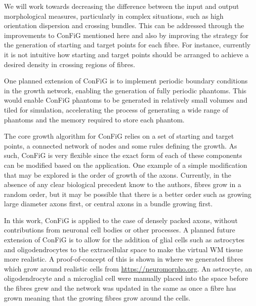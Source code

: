 
We will work towards decreasing the difference between the input and output morphological measures, particularly in complex situations, such as high orientation dispersion and crossing bundles. This can be addressed through the improvements to \ac{ConFiG} mentioned here and also by improving the strategy for the generation of starting and target points for each fibre. For instance, currently it is not intuitive how starting and target points should be arranged to achieve a desired density in crossing regions of fibres.

One planned extension of \ac{ConFiG} is to implement periodic boundary conditions in the growth network, enabling the generation of fully periodic phantoms. This would enable \ac{ConFiG} phantoms to be generated in relatively small volumes and tiled for simulation, accelerating the process of generating a wide range of phantoms and the memory required to store each phantom.

The core growth algorithm for \ac{ConFiG} relies on a set of starting and target points, a connected network of nodes and some rules defining the growth. As such, \ac{ConFiG} is very flexible since the exact form of each of these components can be modified based on the application. One example of a simple modification that may be explored is the order of growth of the axons. Currently, in the absence of any clear biological precedent know to the authors, fibres grow in a random order, but it may be possible that there is a better order such as growing large diameter axons first, or central axons in a bundle growing first.

In this work, \ac{ConFiG} is applied to the case of densely packed axons, without contributions from neuronal cell bodies or other processes. A planned future extension of \ac{ConFiG} is to allow for the addition of glial cells such as astrocytes and oligodendrocytes \cite{Palombo2019} to the extracellular space to make the virtual \ac{WM} tissue more realistic. A proof-of-concept of this is shown in  where we generated fibres which grow around realistic cells from \url{https://neuromorpho.org}. An astrocyte, an oligodendrocyte and a microglial cell were manually placed into the space before the fibres grew and the network was updated in the same as once a fibre has grown meaning that the growing fibres grow around the cells. 

